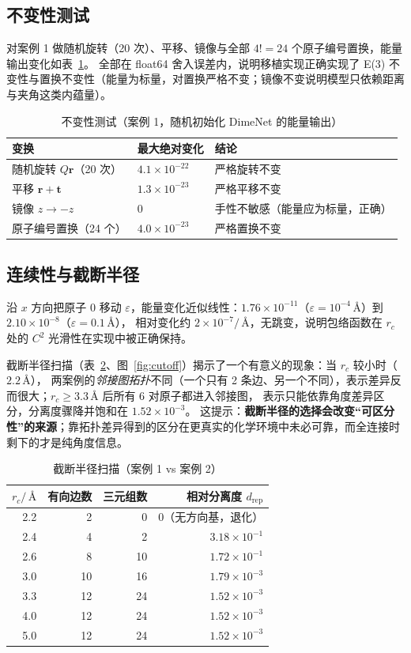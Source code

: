 \documentclass[UTF8,a4paper,11pt]{ctexart}
\newcommand{\ang}{\,\text{\AA}}
\begin{document}
\subsection{不变性测试}
对案例 1 做随机旋转（20 次）、平移、镜像与全部 $4!=24$ 个原子编号置换，能量输出变化如表~\ref{tab:invar}。
全部在 float64 舍入误差内，说明移植实现正确实现了 E(3) 不变性与置换不变性（能量为标量，对置换严格不变；镜像不变说明模型只依赖距离与夹角这类内蕴量）。

\begin{table}[H]
\centering\small
\caption{不变性测试（案例 1，随机初始化 DimeNet 的能量输出）}
\label{tab:invar}
\begin{tabular}{@{}lll@{}}
\toprule
变换 & 最大绝对变化 & 结论\\
\midrule
随机旋转 $Q\bm r$（20 次） & $4.1\times10^{-22}$ & 严格旋转不变\\
平移 $\bm r+\bm t$ & $1.3\times10^{-23}$ & 严格平移不变\\
镜像 $z\to-z$ & $0$ & 手性不敏感（能量应为标量，正确）\\
原子编号置换（24 个） & $4.0\times10^{-23}$ & 严格置换不变\\
\bottomrule
\end{tabular}
\end{table}

\subsection{连续性与截断半径}
沿 $x$ 方向把原子 0 移动 $\varepsilon$，能量变化近似线性：$1.76\times10^{-11}$（$\varepsilon=10^{-4}\ang$）到 $2.10\times10^{-8}$（$\varepsilon=0.1\ang$），
相对变化约 $2\times10^{-7}/\ang$，无跳变，说明包络函数在 $r_c$ 处的 $C^2$ 光滑性在实现中被正确保持。

截断半径扫描（表~\ref{tab:cutoff}、图~\ref{fig:cutoff}）揭示了一个有意义的现象：当 $r_c$ 较小时（$2.2\ang$），
两案例的\emph{邻接图拓扑}不同（一个只有 2 条边、另一个不同），表示差异反而很大；$r_c\ge3.3\ang$ 后所有 6 对原子都进入邻接图，
表示只能依靠角度差异区分，分离度骤降并饱和在 $1.52\times10^{-3}$。
这提示：\textbf{截断半径的选择会改变“可区分性”的来源}；靠拓扑差异得到的区分在更真实的化学环境中未必可靠，而全连接时剩下的才是纯角度信息。

\begin{table}[H]
\centering\small
\caption{截断半径扫描（案例 1 vs 案例 2）}
\label{tab:cutoff}
\begin{tabular}{@{}rrrr@{}}
\toprule
$r_c/\ang$ & 有向边数 & 三元组数 & 相对分离度 $d_{\mathrm{rep}}$\\
\midrule
2.2 & 2 & 0 & $0$（无方向基，退化）\\
2.4 & 4 & 2 & $3.18\times10^{-1}$\\
2.6 & 8 & 10 & $1.72\times10^{-1}$\\
3.0 & 10 & 16 & $1.79\times10^{-3}$\\
3.3 & 12 & 24 & $1.52\times10^{-3}$\\
4.0 & 12 & 24 & $1.52\times10^{-3}$\\
5.0 & 12 & 24 & $1.52\times10^{-3}$\\
\bottomrule
\end{tabular}
\end{table}
\end{document}
